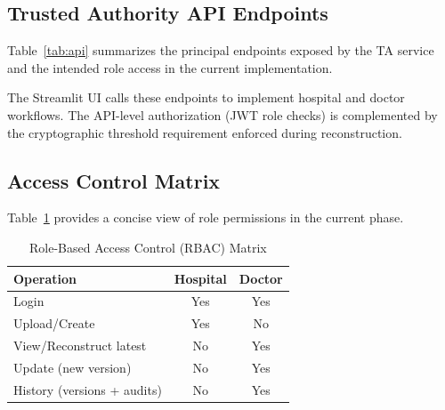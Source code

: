 \documentclass{IEEEtran}
\begin{document}
\subsection{Trusted Authority API Endpoints}
Table~\ref{tab:api} summarizes the principal endpoints exposed by the TA service and the intended role access in the current implementation.
\begin{table}[!t]
\caption{Trusted Authority API Surface (Summary)}
\label{tab:api}
\centering
\footnotesize
\setlength{\tabcolsep}{3pt}
\end{table}

The Streamlit UI calls these endpoints to implement hospital and doctor workflows. The API-level authorization (JWT role checks) is complemented by the cryptographic threshold requirement enforced during reconstruction.

\subsection{Access Control Matrix}
Table~\ref{tab:ac} provides a concise view of role permissions in the current phase.
\begin{table}[!t]
\caption{Role-Based Access Control (RBAC) Matrix}
\label{tab:ac}
\centering
\footnotesize
\setlength{\tabcolsep}{3pt}
\begin{tabular}{|l|c|c|}
\hline
\textbf{Operation} & \textbf{Hospital} & \textbf{Doctor} \\
\hline
Login & Yes & Yes \\
Upload/Create & Yes & No \\
View/Reconstruct latest & No & Yes \\
Update (new version) & No & Yes \\
History (versions + audits) & No & Yes \\
\hline
\end{tabular}
\end{table}
\end{document}
